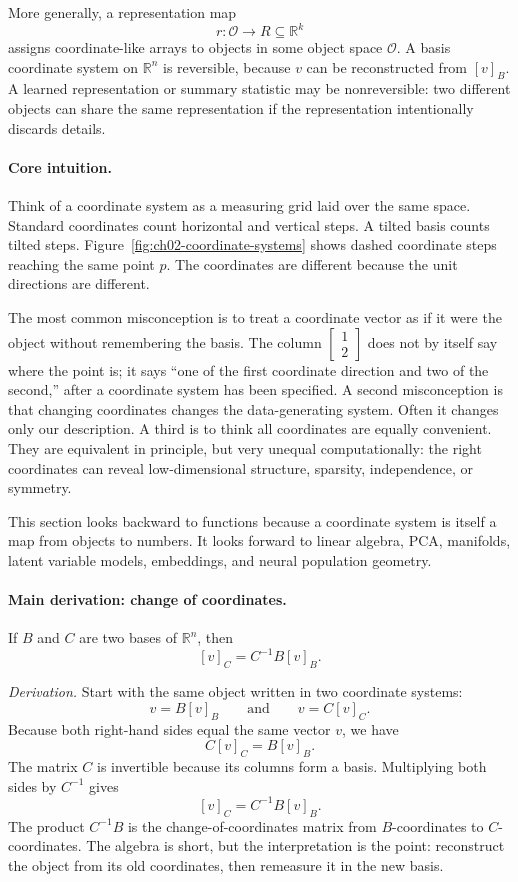 More generally, a representation map
\[
r:\mathcal{O}\to R\subseteq\mathbb{R}^k
\]
assigns coordinate-like arrays to objects in some object space \(\mathcal{O}\). A basis coordinate system on \(\mathbb{R}^n\) is reversible, because \(v\) can be reconstructed from \([v]_B\). A learned representation or summary statistic may be nonreversible: two different objects can share the same representation if the representation intentionally discards details.

\paragraph{Core intuition.}
Think of a coordinate system as a measuring grid laid over the same space. Standard coordinates count horizontal and vertical steps. A tilted basis counts tilted steps. Figure~\ref{fig:ch02-coordinate-systems} shows dashed coordinate steps reaching the same point \(p\). The coordinates are different because the unit directions are different.

The most common misconception is to treat a coordinate vector as if it were the object without remembering the basis. The column \(\begin{bmatrix}1\\2\end{bmatrix}\) does not by itself say where the point is; it says ``one of the first coordinate direction and two of the second,'' after a coordinate system has been specified. A second misconception is that changing coordinates changes the data-generating system. Often it changes only our description. A third is to think all coordinates are equally convenient. They are equivalent in principle, but very unequal computationally: the right coordinates can reveal low-dimensional structure, sparsity, independence, or symmetry.

This section looks backward to functions because a coordinate system is itself a map from objects to numbers. It looks forward to linear algebra, PCA, manifolds, latent variable models, embeddings, and neural population geometry.

\paragraph{Main derivation: change of coordinates.}
If \(B\) and \(C\) are two bases of \(\mathbb{R}^n\), then
\[
[v]_C=C^{-1}B[v]_B.
\]

\emph{Derivation.} Start with the same object written in two coordinate systems:
\[
v=B[v]_B
\qquad\text{and}\qquad
v=C[v]_C.
\]
Because both right-hand sides equal the same vector \(v\), we have
\[
C[v]_C=B[v]_B.
\]
The matrix \(C\) is invertible because its columns form a basis. Multiplying both sides by \(C^{-1}\) gives
\[
[v]_C=C^{-1}B[v]_B.
\]
The product \(C^{-1}B\) is the change-of-coordinates matrix from \(B\)-coordinates to \(C\)-coordinates. The algebra is short, but the interpretation is the point: reconstruct the object from its old coordinates, then remeasure it in the new basis.

